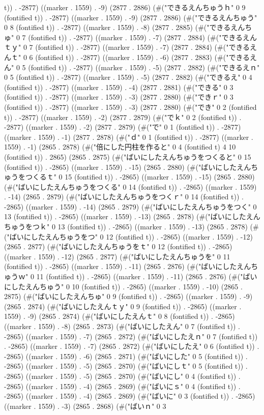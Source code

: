 {t)) . -2877) ((marker . 1559) . -9) (2877 . 2886) (#("できるえんちゅうｈ" 0 9 (fontified t)) . -2877) ((marker . 1559) . -9) (2877 . 2886) (#("できるえんちゅう" 0 8 (fontified t)) . -2877) ((marker . 1559) . -8) (2877 . 2885) (#("できるえんちゅ" 0 7 (fontified t)) . -2877) ((marker . 1559) . -7) (2877 . 2884) (#("できるえんｔｙ" 0 7 (fontified t)) . -2877) ((marker . 1559) . -7) (2877 . 2884) (#("できるえんｔ" 0 6 (fontified t)) . -2877) ((marker . 1559) . -6) (2877 . 2883) (#("できるえん" 0 5 (fontified t)) . -2877) ((marker . 1559) . -5) (2877 . 2882) (#("できるえｎ" 0 5 (fontified t)) . -2877) ((marker . 1559) . -5) (2877 . 2882) (#("できるえ" 0 4 (fontified t)) . -2877) ((marker . 1559) . -4) (2877 . 2881) (#("できる" 0 3 (fontified t)) . -2877) ((marker . 1559) . -3) (2877 . 2880) (#("できｒ" 0 3 (fontified t)) . -2877) ((marker . 1559) . -3) (2877 . 2880) (#("でき" 0 2 (fontified t)) . -2877) ((marker . 1559) . -2) (2877 . 2879) (#("でｋ" 0 2 (fontified t)) . -2877) ((marker . 1559) . -2) (2877 . 2879) (#("で" 0 1 (fontified t)) . -2877) ((marker . 1559) . -1) (2877 . 2878) (#("ｄ" 0 1 (fontified t)) . -2877) ((marker . 1559) . -1) (2865 . 2878) (#("倍にした円柱を作ると" 0 4 (fontified t) 4 10 (fontified t)) . 2865) (2865 . 2875) (#("ばいにしたえんちゅうをつくると" 0 15 (fontified t)) . -2865) ((marker . 1559) . -15) (2865 . 2880) (#("ばいにしたえんちゅうをつくるｔ" 0 15 (fontified t)) . -2865) ((marker . 1559) . -15) (2865 . 2880) (#("ばいにしたえんちゅうをつくる" 0 14 (fontified t)) . -2865) ((marker . 1559) . -14) (2865 . 2879) (#("ばいにしたえんちゅうをつくｒ" 0 14 (fontified t)) . -2865) ((marker . 1559) . -14) (2865 . 2879) (#("ばいにしたえんちゅうをつく" 0 13 (fontified t)) . -2865) ((marker . 1559) . -13) (2865 . 2878) (#("ばいにしたえんちゅうをつｋ" 0 13 (fontified t)) . -2865) ((marker . 1559) . -13) (2865 . 2878) (#("ばいにしたえんちゅうをつ" 0 12 (fontified t)) . -2865) ((marker . 1559) . -12) (2865 . 2877) (#("ばいにしたえんちゅうをｔ" 0 12 (fontified t)) . -2865) ((marker . 1559) . -12) (2865 . 2877) (#("ばいにしたえんちゅうを" 0 11 (fontified t)) . -2865) ((marker . 1559) . -11) (2865 . 2876) (#("ばいにしたえんちゅうｗ" 0 11 (fontified t)) . -2865) ((marker . 1559) . -11) (2865 . 2876) (#("ばいにしたえんちゅう" 0 10 (fontified t)) . -2865) ((marker . 1559) . -10) (2865 . 2875) (#("ばいにしたえんちゅ" 0 9 (fontified t)) . -2865) ((marker . 1559) . -9) (2865 . 2874) (#("ばいにしたえんｔｙ" 0 9 (fontified t)) . -2865) ((marker . 1559) . -9) (2865 . 2874) (#("ばいにしたえんｔ" 0 8 (fontified t)) . -2865) ((marker . 1559) . -8) (2865 . 2873) (#("ばいにしたえん" 0 7 (fontified t)) . -2865) ((marker . 1559) . -7) (2865 . 2872) (#("ばいにしたえｎ" 0 7 (fontified t)) . -2865) ((marker . 1559) . -7) (2865 . 2872) (#("ばいにしたえ" 0 6 (fontified t)) . -2865) ((marker . 1559) . -6) (2865 . 2871) (#("ばいにした" 0 5 (fontified t)) . -2865) ((marker . 1559) . -5) (2865 . 2870) (#("ばいにしｔ" 0 5 (fontified t)) . -2865) ((marker . 1559) . -5) (2865 . 2870) (#("ばいにし" 0 4 (fontified t)) . -2865) ((marker . 1559) . -4) (2865 . 2869) (#("ばいにｓ" 0 4 (fontified t)) . -2865) ((marker . 1559) . -4) (2865 . 2869) (#("ばいに" 0 3 (fontified t)) . -2865) ((marker . 1559) . -3) (2865 . 2868) (#("ばいｎ" 0 3 }

